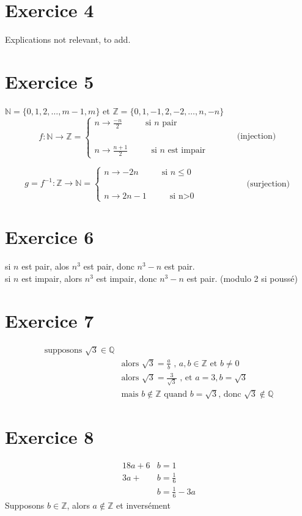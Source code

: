 \documentclass[fontsize=10pt]{article}
\begin{document}
\section*{Exercice 4}
Explications not relevant, to add.
\section*{Exercice 5}
$\mathbb{N}=\{ 0,1,2,\dots,m-1,m\}$ et $\mathbb{Z} = \{0,1,-1,2,-2,\dots,n,-n\}$
\[
  f:\mathbb{N}\rightarrow\mathbb{Z} =\begin{cases}
               n \rightarrow \frac{-n}{2} \hspace{1cm}\text{ si $n$ pair}\\
               \hspace{7cm}\text{(injection)}\\
               n \rightarrow \frac{n+1}{2} \hspace{1cm} \text{ si $n$ est impair}
            \end{cases}
\]

\[
  g=f^{-1}:\mathbb{Z}\rightarrow\mathbb{N} =\begin{cases}
               n \rightarrow -2n \hspace{1cm}\text{ si $n\leq 0$}\\
               \hspace{7cm}\text{(surjection)}\\
               n \rightarrow 2n-1 \hspace{1cm}\text{ si n>0}
            \end{cases}
\]
\section*{Exercice 6}
si $n$ est pair, alos $n^3$ est pair, donc $n^3-n$ est pair.\\
si $n$ est impair, alors $n^3$ est impair, donc $n^3 -n$ est pair. \hspace{0.5cm}(modulo 2 si poussé)
\section*{Exercice 7}
\begin{align*}
\text{supposons } \sqrt{3}\in \mathbb{Q}&\\
&\text{alors }\sqrt{3} = \frac{a}{b} \text{ , } a, b \in \mathbb{Z} \text{ et } b\neq 0\\
&\text{alors }\sqrt{3}=\frac{3}{\sqrt{3}} \text{ , et } a =3, b = \sqrt{3}\\
&\text{mais } b \notin \mathbb{Z} \text{ quand } b =\sqrt{3}\text{, donc } \sqrt{3} \notin \mathbb{Q} 
\end{align*}
\section*{Exercice 8}
\begin{align*}
18a+6&b=1\\
3a+&b=\frac{1}{6}\\
&b = \frac{1}{6} - 3a
\end{align*}
Supposons $b\in \mathbb{Z}$, alors $a\notin \mathbb{Z}$ et inversément
\end{document}
